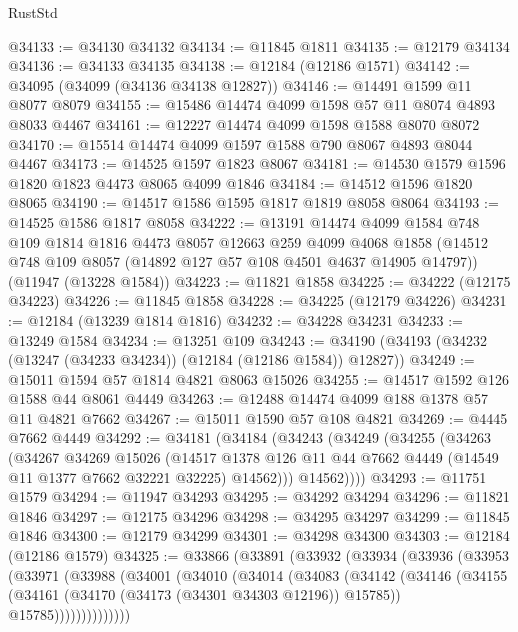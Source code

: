 \begin{lexlean}{RustStd}
\begin{coremodule}
@34133 := @34130 @34132
@34134 := @11845 @1811
@34135 := @12179 @34134
@34136 := @34133 @34135
@34138 := @12184 (@12186 @1571)
@34142 := @34095 (@34099 (@34136 @34138 @12827))
@34146 := @14491 @1599 @11 @8077 @8079
@34155 := @15486 @14474 @4099 @1598 @57 @11 @8074 @4893 @8033 @4467
@34161 := @12227 @14474 @4099 @1598 @1588 @8070 @8072
@34170 := @15514 @14474 @4099 @1597 @1588 @790 @8067 @4893 @8044 @4467
@34173 := @14525 @1597 @1823 @8067
@34181 := @14530 @1579 @1596 @1820 @1823 @4473 @8065 @4099 @1846
@34184 := @14512 @1596 @1820 @8065
@34190 := @14517 @1586 @1595 @1817 @1819 @8058 @8064
@34193 := @14525 @1586 @1817 @8058
@34222 := @13191
    @14474
    @4099
    @1584
    @748
    @109
    @1814
    @1816
    @4473
    @8057
    @12663
    @259
    @4099
    @4068
    @1858
    (@14512 @748 @109 @8057 (@14892 @127 @57 @108 @4501 @4637 @14905 @14797))
    (@11947 (@13228 @1584))
@34223 := @11821 @1858
@34225 := @34222 (@12175 @34223)
@34226 := @11845 @1858
@34228 := @34225 (@12179 @34226)
@34231 := @12184 (@13239 @1814 @1816)
@34232 := @34228 @34231
@34233 := @13249 @1584
@34234 := @13251 @109
@34243 := @34190 (@34193 (@34232 (@13247 (@34233 @34234)) (@12184 (@12186 @1584)) @12827))
@34249 := @15011 @1594 @57 @1814 @4821 @8063 @15026
@34255 := @14517 @1592 @126 @1588 @44 @8061 @4449
@34263 := @12488 @14474 @4099 @188 @1378 @57 @11 @4821 @7662
@34267 := @15011 @1590 @57 @108 @4821
@34269 := @4445 @7662 @4449
@34292 := @34181
    (@34184
      (@34243
        (@34249
          (@34255
            (@34263
              (@34267
                @34269
                @15026
                (@14517
                  @1378
                  @126
                  @11
                  @44
                  @7662
                  @4449
                  (@14549 @11 @1377 @7662 @32221 @32225)
                  @14562)))
            @14562))))
@34293 := @11751 @1579
@34294 := @11947 @34293
@34295 := @34292 @34294
@34296 := @11821 @1846
@34297 := @12175 @34296
@34298 := @34295 @34297
@34299 := @11845 @1846
@34300 := @12179 @34299
@34301 := @34298 @34300
@34303 := @12184 (@12186 @1579)
@34325 := @33866
    (@33891
      (@33932
        (@33934
          (@33936
            (@33953
              (@33971
                (@33988
                  (@34001
                    (@34010
                      (@34014
                        (@34083
                          (@34142
                            (@34146
                              (@34155
                                (@34161 (@34170 (@34173 (@34301 @34303 @12196)) @15785))
                                @15785))))))))))))))

\end{coremodule}
\end{lexlean}
